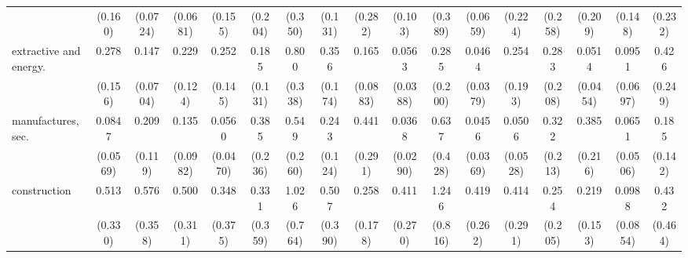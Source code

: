 {\begin{tabular}{l*{16}{c}}
                    &     (0.160)         &    (0.0724)         &    (0.0681)         &     (0.155)         &     (0.204)         &     (0.350)         &     (0.131)         &     (0.282)         &     (0.103)         &     (0.389)         &    (0.0659)         &     (0.224)         &     (0.258)         &     (0.209)         &     (0.148)         &     (0.232)         \\
[1em]
extractive and energy.&       0.278\sym{*}  &       0.147\sym{***}&       0.229\sym{**} &       0.252\sym{*}  &       0.185\sym{*}  &       0.800         &       0.356\sym{*}  &       0.165\sym{***}&      0.0563\sym{***}&       0.285         &      0.0464\sym{***}&       0.254         &       0.283         &      0.0514\sym{***}&      0.0951\sym{**} &       0.426         \\
                    &     (0.156)         &    (0.0704)         &     (0.124)         &     (0.145)         &     (0.131)         &     (0.338)         &     (0.174)         &    (0.0883)         &    (0.0388)         &     (0.200)         &    (0.0379)         &     (0.193)         &     (0.208)         &    (0.0454)         &    (0.0697)         &     (0.249)         \\
[1em]
manufactures, sec.  &      0.0847\sym{***}&       0.209\sym{**} &       0.135\sym{**} &      0.0560\sym{***}&       0.385         &       0.549         &       0.243\sym{**} &       0.441         &      0.0368\sym{***}&       0.637         &      0.0456\sym{***}&      0.0506\sym{**} &       0.322         &       0.385         &      0.0651\sym{***}&       0.185\sym{*}  \\
                    &    (0.0569)         &     (0.119)         &    (0.0982)         &    (0.0470)         &     (0.236)         &     (0.260)         &     (0.124)         &     (0.291)         &    (0.0290)         &     (0.428)         &    (0.0369)         &    (0.0528)         &     (0.213)         &     (0.216)         &    (0.0506)         &     (0.142)         \\
[1em]
construction        &       0.513         &       0.576         &       0.500         &       0.348         &       0.331         &       1.026         &       0.507         &       0.258         &       0.411         &       1.246         &       0.419         &       0.414         &       0.254         &       0.219\sym{*}  &      0.0988\sym{**} &       0.432         \\
                    &     (0.330)         &     (0.358)         &     (0.311)         &     (0.375)         &     (0.359)         &     (0.764)         &     (0.390)         &     (0.178)         &     (0.270)         &     (0.816)         &     (0.262)         &     (0.291)         &     (0.205)         &     (0.153)         &    (0.0854)         &     (0.464)         \\

\end{tabular}}
